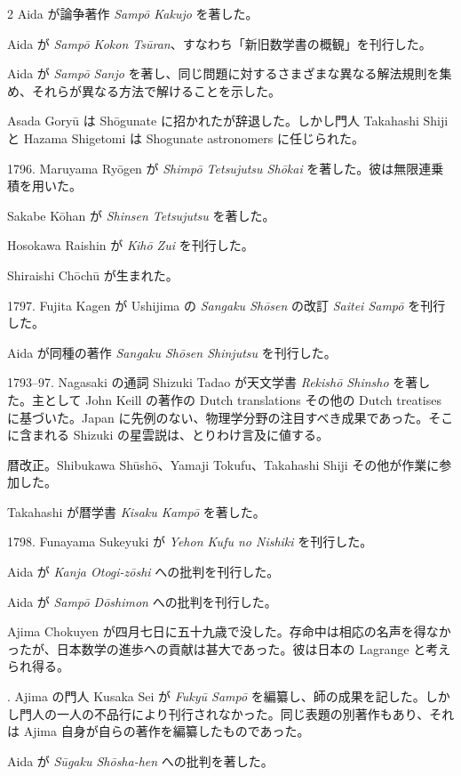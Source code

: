 \documentclass[11pt]{article}
\newcommand{\scanpage}[2]{\clearpage\setcounter{footnote}{0}\noindent{\footnotesize\color{gray}PDF #1 頁 · #2}\par\medskip}
\begin{document}
\scanpage{0200}{第23章年表、印刷頁186}
\begin{multicols}{2}\small
Aida が論争著作 \emph{Sampō Kakujo} を著した。

Aida が \emph{Sampō Kokon Tsūran}、すなわち「新旧数学書の概観」を刊行した。

Aida が \emph{Sampō Sanjo} を著し、同じ問題に対するさまざまな異なる解法規則を集め、それらが異なる方法で解けることを示した。

Asada Goryū は Shōgunate に招かれたが辞退した。しかし門人 Takahashi Shiji と Hazama Shigetomi は Shogunate astronomers に任じられた。

1796. Maruyama Ryōgen が \emph{Shimpō Tetsujutsu Shōkai} を著した。彼は無限連乗積を用いた。

Sakabe Kōhan が \emph{Shinsen Tetsujutsu} を著した。

Hosokawa Raishin が \emph{Kihō Zui} を刊行した。

Shiraishi Chōchū が生まれた。

1797. Fujita Kagen が Ushijima の \emph{Sangaku Shōsen} の改訂 \emph{Saitei Sampō} を刊行した。

Aida が同種の著作 \emph{Sangaku Shōsen Shinjutsu} を刊行した。

1793--97. Nagasaki の通詞 Shizuki Tadao が天文学書 \emph{Rekishō Shinsho} を著した。主として John Keill の著作の Dutch translations その他の Dutch treatises に基づいた。Japan に先例のない、物理学分野の注目すべき成果であった。そこに含まれる Shizuki の星雲説は、とりわけ言及に値する。

暦改正。Shibukawa Shūshō、Yamaji Tokufu、Takahashi Shiji その他が作業に参加した。

Takahashi が暦学書 \emph{Kisaku Kampō} を著した。

1798. Funayama Sukeyuki が \emph{Yehon Kufu no Nishiki} を刊行した。

Aida が \emph{Kanja Otogi-zōshi} への批判を刊行した。

Aida が \emph{Sampō Dōshimon} への批判を刊行した。

Ajima Chokuyen が四月七日に五十九歳で没した。存命中は相応の名声を得なかったが、日本数学の進歩への貢献は甚大であった。彼は日本の Lagrange と考えられ得る。

. Ajima の門人 Kusaka Sei が \emph{Fukyū Sampō} を編纂し、師の成果を記した。しかし門人の一人の不品行により刊行されなかった。同じ表題の別著作もあり、それは Ajima 自身が自らの著作を編纂したものであった。

Aida が \emph{Sūgaku Shōsha-hen} への批判を著した。


\end{multicols}
\end{document}
